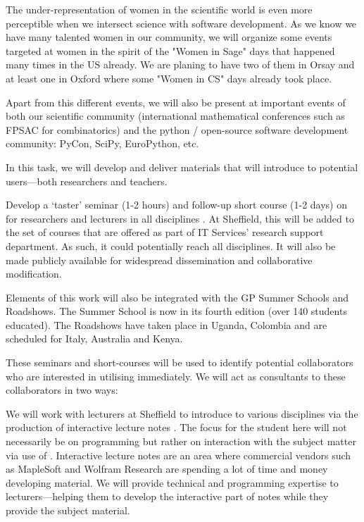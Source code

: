 \begin{workpackage}
\begin{tasklist}
\begin{task}[title=Dissemination: reaching users, lead=PS, partners={UB}, id=dissemination]
The under-representation of women in the scientific world is even more perceptible when we intersect science with software development. As we know we have many talented women in our community, we will organize some events targeted at women in the spirit of the "Women in Sage" days that happened many times in the US already. We are planing to have two of them in Orsay and at least one in Oxford where some "Women in CS" days already took place.

Apart from this different events, we will also be present at important events of both our scientific community (international mathematical conferences such as FPSAC for combinatorics) and the python / open-source software development community: PyCon, SciPy, EuroPython, etc.


\end{task}


\begin{task}[title=Introduce \TheProject to researchers and teachers, id=project-intro,lead=USH,PM=6]

In this task, we will develop and deliver materials that will
introduce \TheProject to potential users---both researchers and
teachers.

Develop a `taster' seminar (1-2 hours) and follow-up short course (1-2
days) on \TheProject for researchers and lecturers in all disciplines
. At Sheffield, this will be added to
the set of courses that are offered as part of IT Services' research
support department. As such, it could potentially reach all
disciplines. It will also be made publicly available for widespread
dissemination and collaborative modification.

Elements of this work will also be integrated with the GP Summer
Schools and Roadshows. The Summer School is now in its fourth edition
(over 140 students educated). The Roadshows have taken place in
Uganda, Colombia and are scheduled for Italy, Australia and Kenya.

These seminars and short-courses will be used to identify potential
collaborators who are interested in utilising \TheProject
immediately. We will act as consultants to these collaborators in two
ways:

We will work with lecturers at Sheffield to introduce \TheProject to
various disciplines via the production of interactive lecture
notes . The focus for the student here will not necessarily be on
programming but rather on interaction with the subject matter via use
of \TheProject. Interactive lecture notes are an area where commercial
vendors such as MapleSoft and Wolfram Research are spending a lot of
time and money developing material. We will provide technical and
programming expertise to lecturers---helping them to develop the
interactive part of notes while they provide the subject material.


\end{task}
\end{tasklist}
\end{workpackage}
